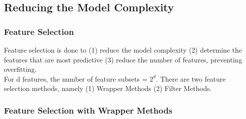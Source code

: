 \documentclass[12pt,a4paper,titlepage,portrait,openany]{book}
\begin{document}
	\subsection{Reducing the Model Complexity}
	\subsubsection{Feature Selection}
	Feature selection is done to (1) reduce the model complexity (2) determine the features that are most predictive (3) reduce the number of features, preventing overfitting. \\
	For d features, the number of feature subsets = $2^d$.
	There are two feature selection methods, namely (1) Wrapper Methods (2) Filter Methods.
	\subsubsection{Feature Selection with Wrapper Methods}
\end{document}
